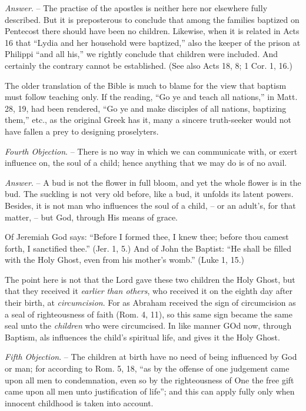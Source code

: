 \documentclass[
]{book}
\begin{document}
\emph{Answer}. -- The practise of the apostles is neither here nor elsewhere fully described. But it is preposterous to conclude that among the families baptized on Pentecost there should have been no children. Likewise, when it is related in Acts 16 that ``Lydia and her household were baptized,'' also the keeper of the prison at Philippi ``and all his,'' we rightly conclude that children were included. And certainly the contrary cannot be established. (See also Acts 18, 8; 1 Cor. 1, 16.)

The older translation of the Bible is much to blame for the view that baptism must follow teaching only. If the reading, ``Go ye and teach all nations,'' in Matt. 28, 19, had been rendered, ``Go ye and make disciples of all nations, baptizing them,'' etc., as the original Greek has it, many a sincere truth-seeker would not have fallen a prey to designing proselyters.

\emph{Fourth Objection}. -- There is no way in which we can communicate with, or exert influence on, the soul of a child; hence anything that we may do is of no avail.

\emph{Answer}. -- A bud is not the flower in full bloom, and yet the whole flower is in the bud. The suckling is not very old before, like a bud, it unfolds its latent powers. Besides, it is not man who influences the soul of a child, -- or an adult's, for that matter, -- but God, through His means of grace.

Of Jeremiah God says: ``Before I formed thee, I knew thee; before thou camest forth, I sanctified thee.'' (Jer. 1, 5.) And of John the Baptist: ``He shall be filled with the Holy Ghost, even from his mother's womb.'' (Luke 1, 15.)

The point here is not that the Lord gave these two children the Holy Ghost, but that they received it \emph{earlier than others}, who received it on the eighth day after their birth, at \emph{circumcision}. For as Abraham received the sign of circumcision as a seal of righteousness of faith (Rom. 4, 11), so this same sign became the same seal unto the \emph{children} who were circumcised. In like manner GOd now, through Baptism, als influences the child's spiritual life, and gives it the Holy Ghost.

\emph{Fifth Objection}. -- The children at birth have no need of being influenced by God or man; for according to Rom. 5, 18, ``as by the offense of one judgement came upon all men to condemnation, even so by the righteousness of One the free gift came upon all men unto justification of life''; and this can apply fully only when innocent childhood is taken into account.
\end{document}
